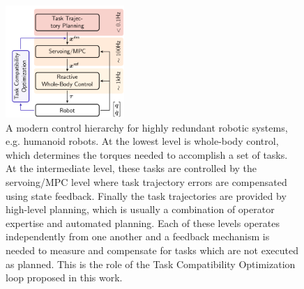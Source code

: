 \begin{figure}[!h]
\centering
\includegraphics[width=0.4\textwidth]{images/control_pyramid.png}
\caption{A modern control hierarchy for highly redundant robotic systems, e.g. humanoid robots. At the lowest level is whole-body control, which determines the torques needed to accomplish a set of tasks. At the intermediate level, these tasks are controlled by the servoing/MPC level where task trajectory errors are compensated using state feedback. Finally the task trajectories are provided by high-level planning, which is usually a combination of operator expertise and automated planning. Each of these levels operates independently from one another and a feedback mechanism is needed to measure and compensate for tasks which are not executed as planned. This is the role of the Task Compatibility Optimization loop proposed in this work.}
\label{fig:control_diagram}
\end{figure}

